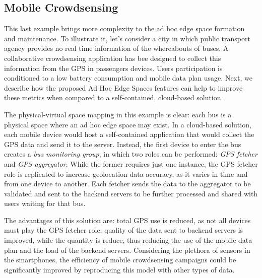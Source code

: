 

\subsection{Mobile Crowdsensing}

This last example brings more complexity to the ad hoc edge space formation and maintenance. To illustrate it, let's consider a city in which public transport agency provides no real time information of the whereabouts of buses. A collaborative crowdsensing application has bee designed to collect this information from the GPS in passengers devices. Users participation is conditioned to a low battery consumption and mobile data plan usage. Next, we describe how the proposed Ad Hoc Edge Spaces features can help to improve these metrics when compared to a self-contained, cloud-based solution.

The physical-virtual space mapping in this example is clear: each bus is a physical space where an ad hoc edge space may exist. In a cloud-based solution, each mobile device would host a self-contained application that would collect the GPS data and send it to the server. Instead, the first device to enter the bus creates a \textit{bus monitoring group}, in which two roles can be performed: \textit{GPS fetcher} and \textit{GPS aggregator}. While the former requires just one instance, the GPS fetcher role is replicated to increase geolocation data accuracy, as it varies in time and from one device to another. Each fetcher sends the data to the aggregator to be validated and sent to the backend servers to be further processed and shared with users waiting for that bus.

The advantages of this solution are: total GPS use is reduced, as not all devices must play the GPS fetcher role; quality of the data sent to backend servers is improved, while the quantity is reduce, thus reducing the use of the mobile data plan and the load of the backend servers. Considering the plethora of sensors in the smartphones, the efficiency of mobile crowdsensing campaigns could be significantly improved by reproducing this model with other types of data.